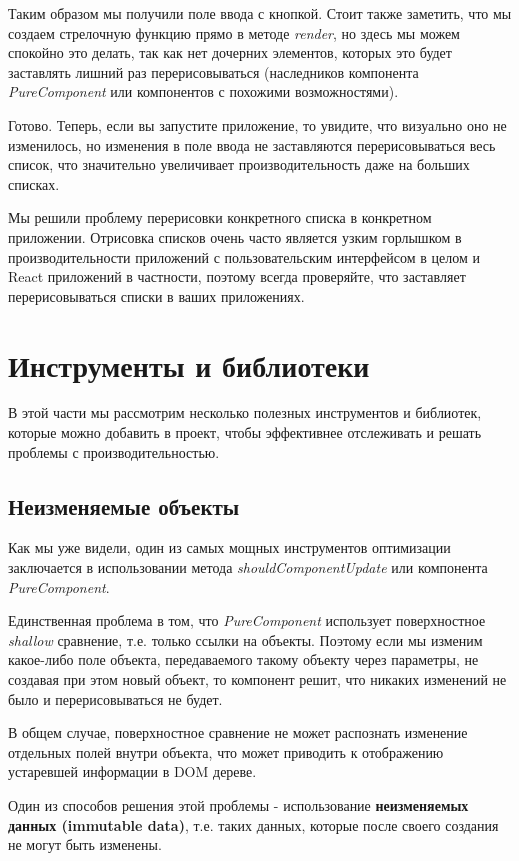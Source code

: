 Таким образом мы получили поле ввода с кнопкой. Стоит также заметить, что мы создаем стрелочную функцию прямо в методе \textit{render}, но здесь мы можем спокойно это делать, так как нет дочерних элементов, которых это будет заставлять лишний раз перерисовываться (наследников компонента \textit{PureComponent} или компонентов с похожими возможностями).

Готово. Теперь, если вы запустите приложение, то увидите, что визуально оно не изменилось, но изменения в поле ввода не заставляются перерисовываться весь список, что значительно увеличивает производительность даже на больших списках.

Мы решили проблему перерисовки конкретного списка в конкретном приложении. Отрисовка списков очень часто является узким горлышком в производительности приложений с пользовательским интерфейсом в целом и React приложений в частности, поэтому всегда проверяйте, что заставляет перерисовываться списки в ваших приложениях.

\section{Инструменты и библиотеки}

В этой части мы рассмотрим несколько полезных инструментов и библиотек, которые можно добавить в проект, чтобы эффективнее отслеживать и решать проблемы с производительностью.

\subsection{Неизменяемые объекты}

Как мы уже видели, один из самых мощных инструментов оптимизации заключается в использовании метода \textit{shouldComponentUpdate} или компонента \textit{PureComponent}.

Единственная проблема в том, что \textit{PureComponent} использует поверхностное \textit{shallow} сравнение, т.е. только ссылки на объекты. Поэтому если мы изменим какое-либо поле объекта, передаваемого такому объекту через параметры, не создавая при этом новый объект, то компонент решит, что никаких изменений не было и перерисовываться не будет.

В общем случае, поверхностное сравнение не может распознать изменение отдельных полей внутри объекта, что может приводить к отображению устаревшей информации в DOM дереве.

Один из способов решения этой проблемы - использование \textbf{неизменяемых данных (immutable data)}, т.е. таких данных, которые после своего создания не могут быть изменены.

